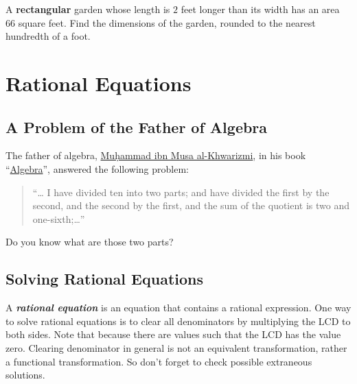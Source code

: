 \documentclass[
  en,11pt]{elegantbook}
\newcommand{\size}[2]{{\fontsize{#1}{0}\selectfont#2}}
\newenvironment{rmdthink}{
	\vspace*{0.5\baselineskip}
	\par\noindent
	\makebox[-4pt][r]{\color{green!90}\size{12}{\faLightbulbO}\,\,}
    \begin{tcolorbox}[
    enhanced,
    title={\textbf{\color{second}Think}},
    title style={left color=blue!10!green!20!white,right color=yellow!20!blue!20!white},
    colback=green!20!white,
    ]
    \sffamily
}{
    \end{tcolorbox}
	\par\ignorespacesafterend
}
\let\BeginKnitrBlock\begin \let\EndKnitrBlock\end
\begin{document}
\BeginKnitrBlock{exercise}
\protect\hypertarget{exr:unnamed-chunk-142}{}{\label{exr:unnamed-chunk-142} }
A \textbf{rectangular} garden whose length is \(2\) feet longer than its width has an area 66 square feet. Find the dimensions of the garden, rounded to the nearest hundredth of a foot.
\EndKnitrBlock{exercise}

\hypertarget{rational-equations}{%
\chapter{Rational Equations}\label{rational-equations}}

\hypertarget{a-problem-of-the-father-of-algebra}{%
\section{A Problem of the Father of Algebra}\label{a-problem-of-the-father-of-algebra}}

\begin{rmdthink}

The father of algebra, \href{https://en.wikipedia.org/wiki/Muhammad_ibn_Musa_al-Khwarizmi\#Algebra}{Muḥammad ibn Musa al-Khwarizmi}, in his book ``\href{https://archive.org/details/algebraofmohamme00khuwrich/page/44/mode/2up}{Algebra}'', answered the following problem:

\begin{quote}
``\ldots{} I have divided ten into two parts; and have divided the first by the second, and the second by the first, and the sum of the quotient is two and one-sixth;\ldots{}''
\end{quote}

Do you know what are those two parts?

\end{rmdthink}

\hypertarget{solving-rational-equations}{%
\section{Solving Rational Equations}\label{solving-rational-equations}}

A \textbf{\emph{rational equation}} is an equation that contains a rational expression. One way to solve rational equations is to clear all denominators by multiplying the LCD to both sides. Note that because there are values such that the LCD has the value zero. Clearing denominator in general is not an equivalent transformation, rather a functional transformation. So don't forget to check possible extraneous solutions.
\end{document}
